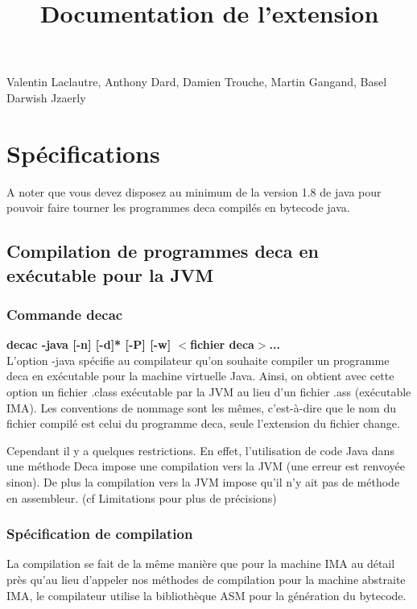 \documentclass[12pt, a4paper, one side]{article}
\title{Documentation de l'extension}
\author{}
\date{}
\begin{document}
    \maketitle

    \begin{center}
        Valentin Laclautre, Anthony Dard, Damien Trouche, Martin Gangand, Basel Darwish Jzaerly
    \end{center}

    \tableofcontents

    \newpage

    \section{Spécifications}

    A noter que vous devez disposez au minimum de la version 1.8 de java pour
    pouvoir faire tourner les programmes deca compilés en bytecode java.

    \subsection{Compilation de programmes deca en exécutable pour la JVM}
    \subsubsection{Commande decac}
    \textbf{decac -java [-n] [-d]* [-P] [-w] $<$fichier deca$>$...}
    \\

    L'option -java spécifie au compilateur qu'on souhaite compiler un programme deca en exécutable pour la machine virtuelle Java.
    Ainsi, on obtient avec cette option un fichier .class exécutable par la JVM au lieu d'un fichier .ass (exécutable IMA). Les conventions de nommage sont les mêmes, c'est-à-dire que le nom du fichier compilé est celui du programme deca, seule l'extension du fichier change.

    Cependant il y a quelques restrictions. En effet, l'utilisation de code Java dans une méthode Deca impose une compilation vers la JVM (une erreur est renvoyée sinon). De plus la compilation vers la JVM impose qu'il n'y ait pas de méthode en assembleur. (cf Limitations pour plus de précisions)

    \subsubsection{Spécification de compilation}
    La compilation se fait de la même manière que pour la machine IMA au détail près qu'au lieu d'appeler nos méthodes de compilation pour la machine abstraite IMA, le compilateur utilise la bibliothèque ASM\cite{ASM} pour la génération du bytecode.
\end{document}
